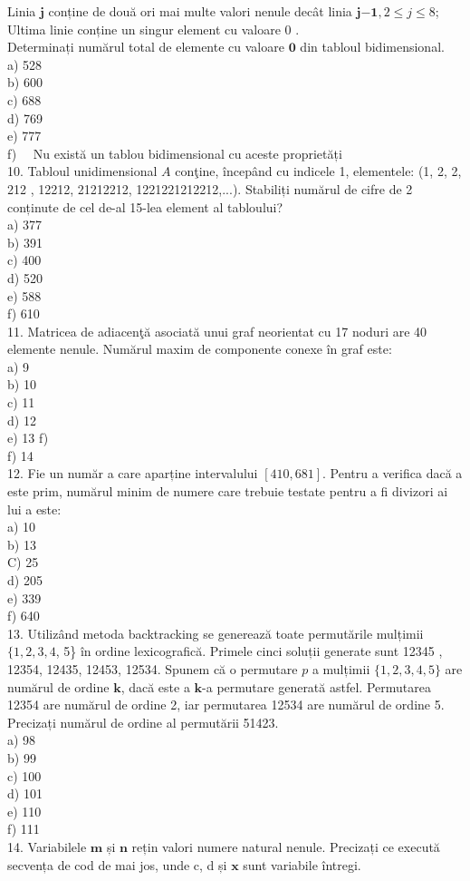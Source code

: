 \documentclass[10pt]{article}
\begin{document}
Linia $\mathbf{j}$ conține de două ori mai multe valori nenule decât linia $\mathbf{j} \mathbf{- 1}, 2 \leq j \leq 8$; Ultima linie conține un singur element cu valoare 0 .\\
Determinați numărul total de elemente cu valoare $\mathbf{0}$ din tabloul bidimensional.\\
a) 528\\
b) 600\\
c) 688\\
d) 769\\
e) 777\\
f) $\quad \mathrm{Nu}$ există un tablou bidimensional cu aceste proprietăți\\
10. Tabloul unidimensional $A$ conţine, începând cu indicele 1, elementele: (1, 2, 2, 212 , 12212, 21212212, 1221221212212,...). Stabiliți numărul de cifre de 2 conținute de cel de-al 15-lea element al tabloului?\\
a) 377\\
b) 391\\
c) 400\\
d) 520\\
e) 588\\
f) 610\\
11. Matricea de adiacenţă asociată unui graf neorientat cu 17 noduri are 40 elemente nenule. Numărul maxim de componente conexe în graf este:\\
a) 9\\
b) 10\\
c) 11\\
d) 12\\
e) 13 f)\\
f) 14\\
12. Fie un număr a care aparține intervalului $[410,681]$. Pentru a verifica dacă a este prim, numărul minim de numere care trebuie testate pentru a fi divizori ai lui a este:\\
a) 10\\
b) 13\\
C) 25\\
d) 205\\
e) 339\\
f) 640\\
13. Utilizând metoda backtracking se generează toate permutările mulțimii $\{1,2,3,4$, 5\} în ordine lexicografică. Primele cinci soluții generate sunt 12345 , 12354, 12435, 12453, 12534. Spunem că o permutare $p$ a mulțimii $\{1,2,3,4,5\}$ are numărul de ordine $\mathbf{k}$, dacă este a $\mathbf{k}$-a permutare generată astfel. Permutarea 12354 are numărul de ordine 2, iar permutarea 12534 are numărul de ordine 5. Precizați numărul de ordine al permutării 51423.\\
a) 98\\
b) 99\\
c) 100\\
d) 101\\
e) 110\\
f) 111\\
14. Variabilele $\mathbf{m}$ și $\mathbf{n}$ rețin valori numere natural nenule. Precizați ce execută secvența de cod de mai jos, unde c, d și $\mathbf{x}$ sunt variabile întregi.
\end{document}
